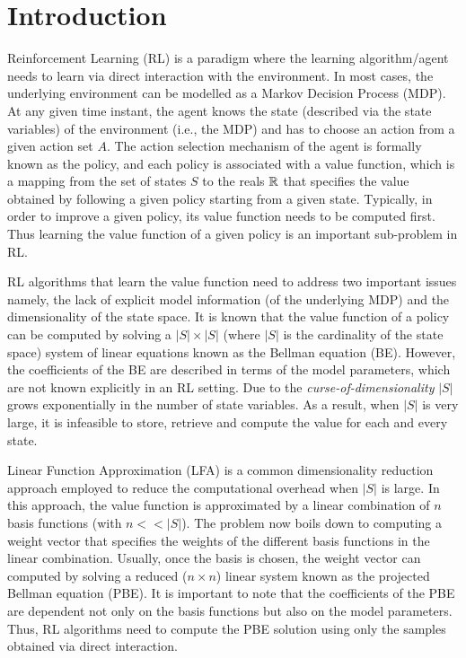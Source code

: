 \section{Introduction}
Reinforcement Learning (RL) is a paradigm where the learning algorithm/agent needs to learn via direct interaction with the environment. In most cases, the underlying environment can be modelled as a Markov Decision Process (MDP). At any given time instant, the agent knows the state (described via the state variables) of the environment (i.e., the MDP) and has to choose an action from a given action set $A$. The action selection mechanism of the agent is formally known as the policy, and each policy is associated with a value function, which is a mapping from the set of states $S$ to the reals $\mathbb{R}$ that specifies the value obtained by following a given policy starting from a given state. Typically, in order to improve a given policy, its value function needs to be computed first. Thus learning the value function of a given policy is an important sub-problem in RL.\par
RL algorithms that learn the value function need to address two important issues namely, the lack of explicit model information (of the underlying MDP) and the dimensionality of the state space. It is known that the value function of a policy can be computed by solving a $|S|\times|S|$ (where $|S|$ is the cardinality of the state space) system of linear equations known as the Bellman equation (BE). However, the coefficients of the BE are described in terms of the model parameters, which are not known explicitly in an RL setting. Due to the \emph{curse-of-dimensionality} $|S|$ grows exponentially in the number of state variables. As a result, when $|S|$ is very large, it is infeasible to store, retrieve and compute the value for each and every state.\par
Linear Function Approximation (LFA) is a common dimensionality reduction approach employed to reduce the computational overhead when $|S|$ is large. In this approach, the value function is approximated by a linear combination of $n$ basis functions (with $n<<|S|$). The problem now boils down to computing a weight vector that specifies the weights of the different basis functions in the linear combination. Usually, once the basis is chosen, the weight vector can computed by solving a reduced ($n\times n$) linear system known as the projected Bellman equation (PBE). It is important to note that the coefficients of the PBE are dependent not only on the basis functions but also on the model parameters. Thus, RL algorithms need to compute the PBE solution using only the samples obtained via direct interaction.\par
